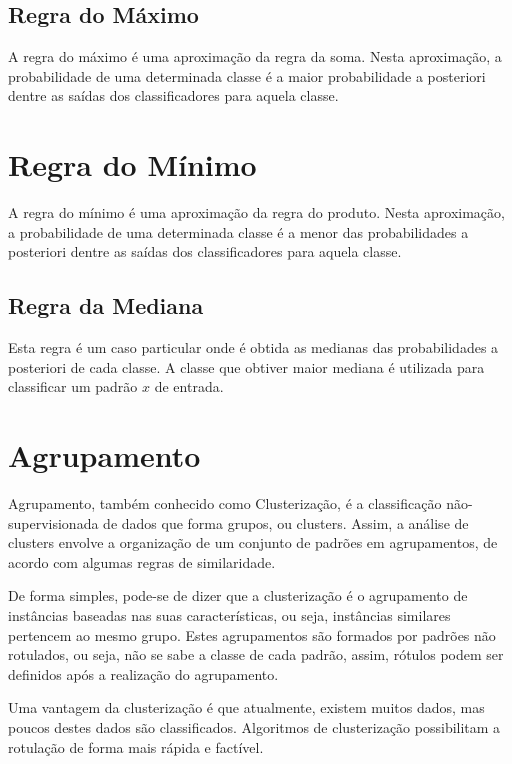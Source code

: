 \subsection{Regra do Máximo}
\label{subsubsec:regradomaximo}

A regra do máximo é uma aproximação da regra da soma. Nesta aproximação, a probabilidade de uma determinada classe é a maior probabilidade a posteriori dentre as saídas dos classificadores para aquela classe.

\section{Regra do Mínimo}
\label{subsubsec:regradominimo}

A regra do mínimo é uma aproximação da regra do produto. Nesta aproximação, a probabilidade de uma determinada classe é a menor das probabilidades a posteriori dentre as saídas dos classificadores para aquela classe.


\subsection{Regra da Mediana}
\label{subsubsec:regradamediana}

Esta regra é um caso particular onde é obtida as medianas das probabilidades a posteriori de cada classe. A classe que obtiver maior mediana é utilizada para classificar um padrão $x$ de entrada.

\section{Agrupamento}

Agrupamento, também conhecido como Clusterização, é a classificação não-supervisionada de dados que forma grupos, ou clusters. Assim, a análise de clusters envolve a organização de um conjunto de padrões em agrupamentos, de acordo com algumas regras de similaridade.

De forma simples, pode-se de dizer que a clusterização é o agrupamento de instâncias baseadas nas suas características, ou seja, instâncias similares pertencem ao mesmo grupo. Estes agrupamentos são formados por padrões não rotulados, ou seja, não se sabe a classe de cada padrão, assim, rótulos podem ser definidos após a realização do agrupamento.

Uma vantagem da clusterização é que atualmente, existem muitos dados, mas poucos destes dados são classificados. Algoritmos de clusterização possibilitam a rotulação de forma mais rápida e factível.

